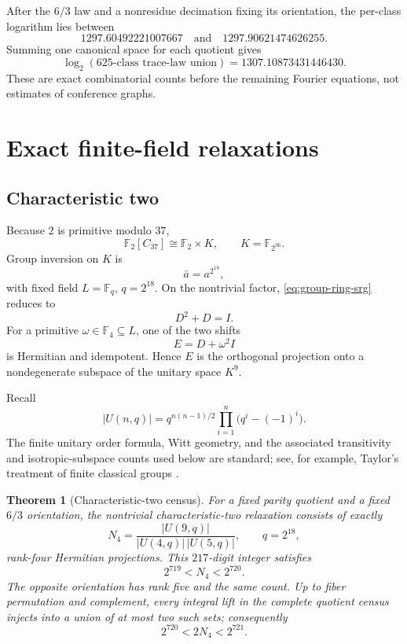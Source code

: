 \documentclass[11pt]{article}
\newtheorem{theorem}{Theorem}[section]
\theoremstyle{definition}
\newcommand{\F}{\mathbb{F}}
\begin{document}
After the \(6/3\) law and a nonresidue decimation fixing its orientation,
the per-class logarithm lies between
\[
1297.60492221007667
\quad\text{and}\quad
1297.90621474626255.
\]
Summing one canonical space for each quotient gives
\[
\log_2(\text{\(625\)-class trace-law union})
=1307.10873431446430.
\tag{4.4}\label{eq:trace-union}
\]
These are exact combinatorial counts before the remaining Fourier
equations, not estimates of conference graphs.

\section{Exact finite-field relaxations}
\label{sec:finite-field}

\subsection{Characteristic two}

Because \(2\) is primitive modulo \(37\),
\[
 \F_2[C_{37}]\cong \F_2\times K,
 \qquad K=\F_{2^{36}}.
\]
Group inversion on \(K\) is
\[
 \bar a=a^{2^{18}},
\]
with fixed field \(L=\F_{q}\), \(q=2^{18}\).  On the nontrivial factor,
\eqref{eq:group-ring-srg} reduces to
\[
 D^2+D=I.
\tag{5.1}\label{eq:char2-D}
\]
For a primitive \(\omega\in\F_4\subseteq L\), one of the two shifts
\[
 E=D+\omega^2I
\]
is Hermitian and idempotent.  Hence \(E\) is the orthogonal projection
onto a nondegenerate subspace of the unitary space \(K^9\).

Recall
\[
 |U(n,q)|=q^{n(n-1)/2}
 \prod_{i=1}^{n}\bigl(q^i-(-1)^i\bigr).
\tag{5.2}\label{eq:unitary-order}
\]
The finite unitary order formula, Witt geometry, and the associated
transitivity and isotropic-subspace counts used below are standard; see,
for example, Taylor's treatment of finite classical groups
\cite{taylor-classical-groups}.

\begin{theorem}[Characteristic-two census]
\label{thm:mod2-count}
For a fixed parity quotient and a fixed \(6/3\) orientation, the
nontrivial characteristic-two relaxation consists of exactly
\[
 N_4=
 \frac{|U(9,q)|}{|U(4,q)|\,|U(5,q)|},
 \qquad q=2^{18},
\tag{5.3}\label{eq:N4}
\]
rank-four Hermitian projections.  This \(217\)-digit integer satisfies
\[
2^{719}<N_4<2^{720}.
\tag{5.4}\label{eq:N4-bound}
\]
The opposite orientation has rank five and the same count.  Up to fiber
permutation and complement, every integral lift in the complete quotient
census injects into a union of at most two such sets; consequently
\[
2^{720}<2N_4<2^{721}.
\tag{5.5}\label{eq:all-mod2-bound}
\]
\end{theorem}
\end{document}
